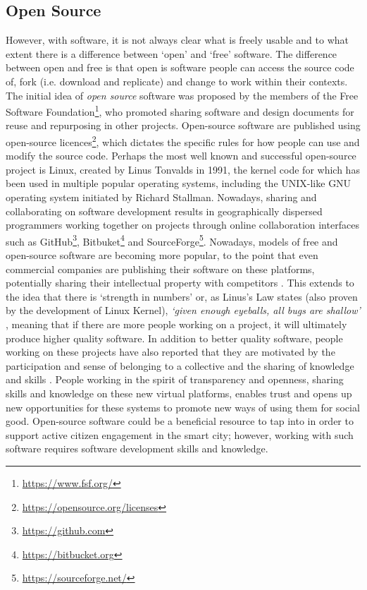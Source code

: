 \subsection{Open Source}
\label{sub:open-source}
However, with software, it is not always clear what is freely usable and to what extent there is a difference between `open' and `free' software. The difference between open and free is that open is software people can access the source code of, fork (i.e. download and replicate) and change to work within their contexts. The initial idea of \textit{open source} software was proposed by the members of the Free Software Foundation\footnote{\url{https://www.fsf.org/}}, who promoted sharing software and design documents for reuse and repurposing in other projects. Open-source software are published using open-source licences\footnote{\url{https://opensource.org/licenses}}, which dictates the specific rules for how people can use and modify the source code. Perhaps the most well known and successful open-source project is Linux, created by Linus Tonvalds in 1991, the kernel code for which has been used in multiple popular operating systems, including the UNIX-like GNU operating system initiated by Richard Stallman. Nowadays, sharing and collaborating on software development results in geographically dispersed programmers working together on projects through online collaboration interfaces \citep{west_contrasting_2005} such as GitHub\footnote{\url{https://github.com}}, Bitbuket\footnote{\url{https://bitbucket.org}} and SourceForge\footnote{\url{https://sourceforge.net/}}. Nowadays, models of free and open-source software are becoming more popular, to the point that even commercial companies are publishing their software on these platforms, potentially sharing their intellectual property with competitors \citep{west_challenges_2006}. This extends to the idea that there is `strength in numbers' or, as Linus's Law states (also proven by the development of Linux Kernel), \textit{`given enough eyeballs, all bugs are shallow'} \citep{raymond_cathedral_2001}, meaning that if there are more people working on a project, it will ultimately produce higher quality software. In addition to better quality software, people working on these projects have also reported that they are motivated by the participation and sense of belonging to a collective and the sharing of knowledge and skills \citep{lakhani_why_2003}. People working in the spirit of transparency and openness, sharing skills and knowledge on these new virtual platforms, enables trust and opens up new opportunities for these systems to promote new ways of using them for social good. Open-source software could be a beneficial resource to tap into in order to support active citizen engagement in the smart city; however, working with such software requires software development skills and knowledge.

